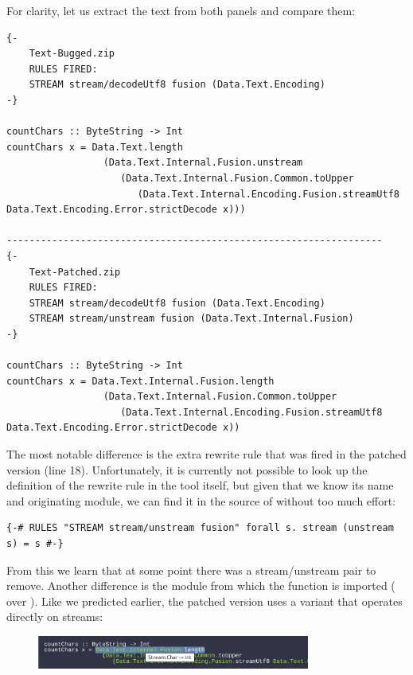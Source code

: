 For clarity, let us extract the text from both panels and compare them:

\begin{listing}[H]
\begin{verbatim}
{-
    Text-Bugged.zip
    RULES FIRED:
    STREAM stream/decodeUtf8 fusion (Data.Text.Encoding)
-}

countChars :: ByteString -> Int
countChars x = Data.Text.length
                 (Data.Text.Internal.Fusion.unstream
                    (Data.Text.Internal.Fusion.Common.toUpper
                       (Data.Text.Internal.Encoding.Fusion.streamUtf8 Data.Text.Encoding.Error.strictDecode x)))

------------------------------------------------------------------
{-
    Text-Patched.zip
    RULES FIRED:
    STREAM stream/decodeUtf8 fusion (Data.Text.Encoding)
    STREAM stream/unstream fusion (Data.Text.Internal.Fusion)
-}

countChars :: ByteString -> Int
countChars x = Data.Text.Internal.Fusion.length
                 (Data.Text.Internal.Fusion.Common.toUpper
                    (Data.Text.Internal.Encoding.Fusion.streamUtf8 Data.Text.Encoding.Error.strictDecode x))
\end{verbatim}
\end{listing}

The most notable difference is the extra rewrite rule that was fired in the patched version (line 18).
Unfortunately, it is currently not possible to look up the definition of the rewrite rule in the tool itself, but
given that we know its name and originating module, we can find it in the source of  without too much effort:

\begin{listing}[H]
\begin{verbatim}
{-# RULES "STREAM stream/unstream fusion" forall s. stream (unstream s) = s #-}
\end{verbatim}
\end{listing}

From this we learn that at some point there was a stream/unstream pair to remove. Another difference is the module from which
the  function is imported ( over ). Like we predicted earlier,
the patched version uses a variant that operates directly on streams:

\begin{figure}[H]
\centering
\includegraphics[width=0.8\textwidth]{figs/countchars_7.png}
\end{figure}

